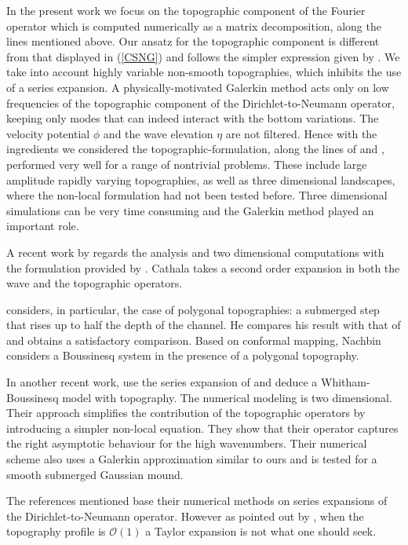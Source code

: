 \documentclass[11pt]{article}
\begin{document}
In the present work we focus on the topographic component of the Fourier operator
which  is computed numerically as a matrix decomposition,
along the lines mentioned above.  Our ansatz for the topographic component is different from that 
displayed in (\ref{CSNG}) and follows the simpler expression given by \cite{Paul1998}.  
We take into account highly variable non-smooth topographies, 
which inhibits the use of a series expansion. A physically-motivated Galerkin method
acts only on low frequencies of the topographic component of the Dirichlet-to-Neumann
operator, keeping only modes that can indeed interact with the bottom variations. 
The velocity potential $\phi$ and the wave elevation $\eta$ are not filtered. 
Hence with the ingredients we considered the topographic-formulation, along the lines of \cite{Paul1998} and  \cite{CSNG}, 
performed very well for a range of nontrivial problems. These include large amplitude rapidly varying topographies, as well as
three dimensional landscapes, where the non-local formulation had not been tested before. 
Three dimensional simulations can be very time consuming and the Galerkin method played an important role. 

A recent work by \citet{Cathala} regards the analysis and two dimensional computations with the formulation provided by \cite{CSNG}. 
Cathala takes a second order expansion in both the wave  and the topographic operators. 

\citet{Cathala}  considers, in particular, the case of polygonal topographies: a submerged step that rises 
up to half the depth of the channel. He compares his result with that of \citet{Nachbin2003} and 
obtains a satisfactory comparison.
Based on conformal mapping, Nachbin considers a Boussinesq system in the presence of a polygonal topography. 



In another recent work,  \citet{VargasPanayotaros} use the series expansion of \citet{CSNG} and deduce a 
Whitham-Boussinesq model with topography. The numerical modeling is two dimensional.
Their approach simplifies the contribution of the topographic operators 
by introducing a simpler non-local equation. They show that their operator captures the right asymptotic behaviour 
for the high wavenumbers. Their numerical scheme also uses a Galerkin approximation similar to ours and is tested for
a smooth submerged Gaussian mound.

The references mentioned  base their numerical methods on  series expansions of the Dirichlet-to-Neumann operator. 
However as pointed out by \citet{CSNG}, when the topography profile is $\mathcal{O}(1)$ a Taylor expansion 
is not what one should seek. 
\end{document}
